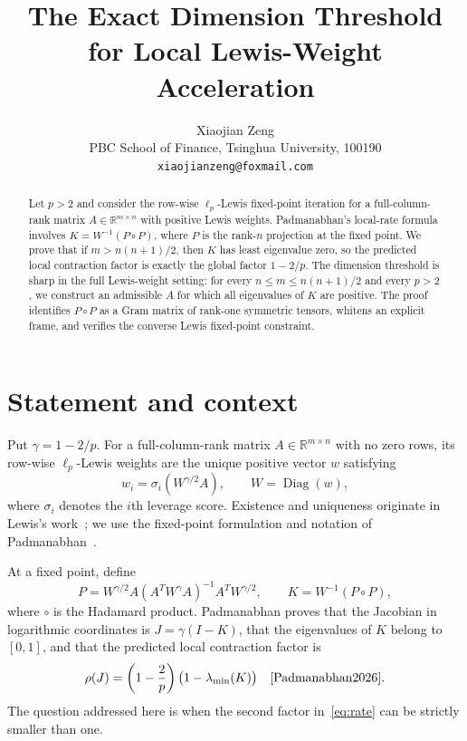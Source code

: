 \documentclass[11pt]{article}
\title{The Exact Dimension Threshold for Local Lewis-Weight Acceleration}
\author{Xiaojian Zeng\\
PBC School of Finance, Tsinghua University, 100190\\
\texttt{xiaojianzeng@foxmail.com}}
\date{}
\newcommand{\R}{\mathbb{R}}
\newcommand{\Diag}{\operatorname{Diag}}
\begin{document}
\maketitle

\begin{abstract}
Let $p>2$ and consider the row-wise $\ell_p$-Lewis fixed-point iteration for a
full-column-rank matrix $A\in\R^{m\times n}$ with positive Lewis weights.
Padmanabhan's local-rate formula involves
$K=W^{-1}(P\circ P)$, where $P$ is the rank-$n$ projection at the fixed point.
We prove that if $m>n(n+1)/2$, then $K$ has least eigenvalue zero, so the
predicted local contraction factor is exactly the global factor $1-2/p$.
The dimension threshold is sharp in the full Lewis-weight setting: for every
$n\leq m\leq n(n+1)/2$ and every $p>2$, we construct an admissible $A$ for
which all eigenvalues of $K$ are positive.  The proof identifies $P\circ P$
as a Gram matrix of rank-one symmetric tensors, whitens an explicit frame,
and verifies the converse Lewis fixed-point constraint.
\end{abstract}

\section{Statement and context}

Put $\gamma=1-2/p$.  For a full-column-rank matrix
$A\in\R^{m\times n}$ with no zero rows, its row-wise $\ell_p$-Lewis weights
are the unique positive vector $w$ satisfying
\[
 w_i=\sigma_i(W^{\gamma/2}A),\qquad W=\Diag(w),
\]
where $\sigma_i$ denotes the $i$th leverage score.  Existence and uniqueness
originate in Lewis's work~\cite{Lewis1978}; we use the fixed-point formulation
and notation of Padmanabhan~\cite[Definition~1.1]{Padmanabhan2026}.

At a fixed point, define
\begin{equation}\label{eq:PK}
 P=W^{\gamma/2}A(A^T W^\gamma A)^{-1}A^T W^{\gamma/2},
 \qquad K=W^{-1}(P\circ P),
\end{equation}
where $\circ$ is the Hadamard product.  Padmanabhan proves that the Jacobian
in logarithmic coordinates is $J=\gamma(I-K)$, that the eigenvalues of $K$
belong to $[0,1]$, and that the predicted local contraction factor is
\begin{equation}\label{eq:rate}
 \rho(J)=\left(1-\frac{2}{p}\right)
          \bigl(1-\lambda_{\min}(K)\bigr)
 \quad\text{\cite[Lemma~3.1]{Padmanabhan2026}}.
\end{equation}
The question addressed here is when the second factor in~\eqref{eq:rate} can
be strictly smaller than one.
\end{document}
